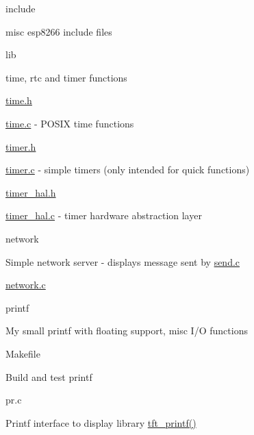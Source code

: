\begin{DoxyItemize}
\begin{DoxyItemize}
\end{DoxyItemize}
\item include
\begin{DoxyItemize}
\item misc esp8266 include files
\end{DoxyItemize}
\item lib
\begin{DoxyItemize}
\item time, rtc and timer functions
\begin{DoxyItemize}
\item \hyperlink{time_8h}{time.\-h}
\item \hyperlink{time_8c}{time.\-c} -\/ P\-O\-S\-I\-X time functions
\item \hyperlink{timer_8h}{timer.\-h}
\item \hyperlink{timer_8c}{timer.\-c} -\/ simple timers (only intended for quick functions)
\item \hyperlink{timer__hal_8h}{timer\-\_\-hal.\-h}
\item \hyperlink{timer__hal_8c}{timer\-\_\-hal.\-c} -\/ timer hardware abstraction layer
\end{DoxyItemize}
\end{DoxyItemize}
\item network
\begin{DoxyItemize}
\item Simple network server -\/ displays message sent by \hyperlink{send_8c}{send.\-c}
\begin{DoxyItemize}
\item \hyperlink{network_8c}{network.\-c}
\end{DoxyItemize}
\end{DoxyItemize}
\item printf
\begin{DoxyItemize}
\item My small printf with floating support, misc I/\-O functions
\begin{DoxyItemize}
\item Makefile
\begin{DoxyItemize}
\item Build and test printf
\end{DoxyItemize}
\item pr.\-c
\begin{DoxyItemize}
\item Printf interface to display library \hyperlink{tft__printf_8c_ad6d6dda4facdc045d477c0cc9403e0c1}{tft\-\_\-printf()}
\end{DoxyItemize}

\end{DoxyItemize}
\end{DoxyItemize}
\end{DoxyItemize}
